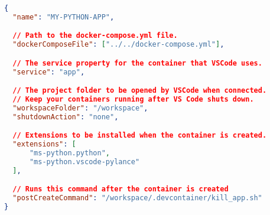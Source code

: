 
\begin{lstlisting}[language=json,caption={\ac{VSCode}s Container Configuration File \code{devcontainer.json} },breaklines=true,label={code::devcontainer_json}]
{
  "name": "MY-PYTHON-APP",

  // Path to the docker-compose.yml file.
  "dockerComposeFile": ["../../docker-compose.yml"],

  // The service property for the container that VSCode uses.
  "service": "app",

  // The project folder to be opened by VSCode when connected.
  // Keep your containers running after VS Code shuts down.
  "workspaceFolder": "/workspace",
  "shutdownAction": "none",

  // Extensions to be installed when the container is created.
  "extensions": [
      "ms-python.python",
      "ms-python.vscode-pylance"
  ],

  // Runs this command after the container is created
  "postCreateCommand": "/workspace/.devcontainer/kill_app.sh"
}


\end{lstlisting}
